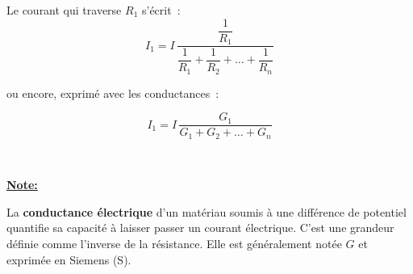 \begin{center}
\begin{minipage}{8cm}
	
\end{minipage}
\begin{minipage}{8cm}

	Le courant qui traverse $R_1$ s'écrit~:
	$$	I_{1} = I \, \dfrac{\dfrac{1}{R_1}}{\dfrac{1}{R_1} + \dfrac{1}{R_2} + \dots + \dfrac{1}{R_n}} $$

	ou encore, exprimé avec les conductances~:

	$$ I_1 = I \, \dfrac{ G_1 } { G_1 + G_2 + \dots + G_n } $$
\end{minipage}\\
\end{center}

\vspace{5mm}

\begin{flushleft}
\textbf{\underline{Note:}} 
\end{flushleft}

La \textbf{conductance électrique} d'un matériau soumis à une différence de potentiel quantifie sa capacité à laisser passer un courant électrique. C'est une grandeur définie comme l'inverse de la résistance. Elle est généralement notée $G$ et exprimée en Siemens (S).

